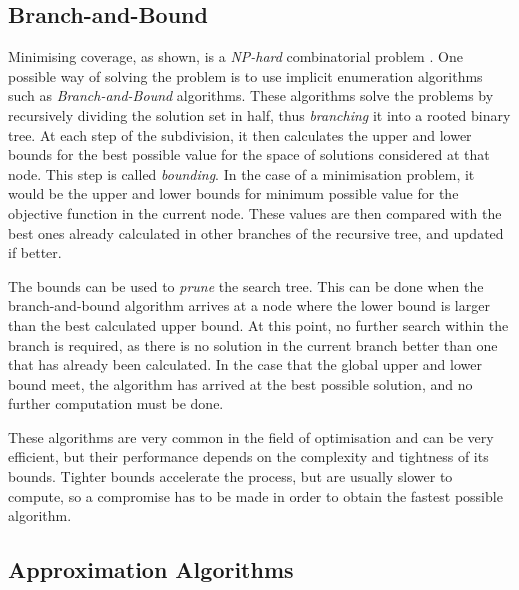 \subsection{Branch-and-Bound}
Minimising coverage, as shown, is a \emph{NP-hard} combinatorial problem \cite{complex}. One possible way of solving the problem is to use implicit enumeration algorithms such as \emph{Branch-and-Bound} algorithms.
These algorithms solve the problems by recursively dividing the solution set in half, thus \emph{branching} it into a rooted binary tree.
At each step of the subdivision, it then calculates the upper and lower bounds for the best possible value for the space of solutions considered at that node. This step is called \emph{bounding}.
In the case of a minimisation problem, it would be the upper and lower bounds for minimum possible value for the objective function in the current node. These values are then compared with the best ones already calculated in other branches of the recursive tree, and updated if better.

The bounds can be used to \emph{prune} the search tree. This can be done when the branch-and-bound algorithm arrives at a node where the lower bound is larger than the best calculated upper bound. At this point, no further search within the branch is required, as there is no solution in the current branch better than one that has already been calculated. 
In the case that the global upper and lower bound meet, the algorithm has arrived at the best possible solution, and no further computation must be done.

These algorithms are very common in the field of optimisation and can be very efficient, but their performance depends on the complexity and tightness of its bounds. Tighter bounds accelerate the process, but are usually slower to compute, so a compromise has to be made in order to obtain the fastest possible algorithm.

\subsection{Approximation Algorithms}


